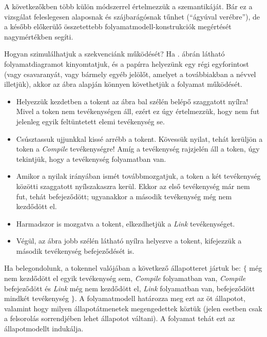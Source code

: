A következőkben több külön módszerrel értelmezzük a  szemantikáját. Bár ez a vizsgálat feleslegesen alaposnak és szájbarágósnak tűnhet (``ágyúval verébre''), de a később előkerülő összetettebb folyamatmodell-konstrukciók megértését nagymértékben segíti.

\begin{pelda}
Hogyan szimulálhatjuk a szekvenciánk működését? Ha . ábrán látható folyamatdiagramot kinyomtatjuk, és a papírra helyezünk egy régi egyforintost (vagy csavaranyát, vagy bármely egyéb jelölőt, amelyet a továbbiakban a  névvel illetjük), akkor az ábra alapján könnyen követhetjük a folyamat működését. \begin{itemize}
  \item Helyezzük kezdetben a tokent az ábra bal szélén belépő szaggatott nyílra! Mivel a token nem tevékenységen áll, ezért ez úgy értelmezzük, hogy nem fut jelenleg egyik feltüntetett elemi tevékenység se.
  \item Csúsztassuk ujjunkkal kissé arrébb a tokent. Kövessük nyilat, tehát kerüljön a token a \emph{Compile} tevékenységre! Amíg a tevékenység rajzjelén áll a token, úgy tekintjük, hogy a tevékenység folyamatban van.
  \item Amikor a nyilak irányában ismét továbbmozgatjuk, a token a két tevékenység közötti szaggatott nyílszakaszra kerül. Ekkor az első tevékenység már nem fut, tehát befejeződött; ugyanakkor a második tevékenység még nem kezdődött el.
  \item Harmadszor is mozgatva a tokent, elkezdhetjük a \emph{Link} tevékenységet.
  \item Végül, az ábra jobb szélén látható nyílra helyezve a tokent, kifejezzük a második tevékenység befejeződését is.
\end{itemize}
Ha belegondolunk, a tokennel valójában  a következő állapotteret jártuk be: $\{$ még nem kezdődött el egyik tevékenység sem, \emph{Compile} folyamatban van, \emph{Compile} befejeződött és \emph{Link} még nem kezdődött el, \emph{Link} folyamatban van, befejeződött mindkét tevékenység $\}$. A folyamatmodell határozza meg ezt az öt állapotot, valamint hogy milyen állapotátmenetek megengedettek köztük (jelen esetben csak a felsorolás sorrendjében lehet állapotot váltani). A folyamat tehát ezt az állapotmodellt indukálja.
\end{pelda}

